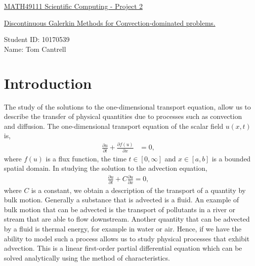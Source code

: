 \documentclass[a4paper, 12pt]{article}
\begin{document}

\begin{center}
\Large\underline{MATH49111 Scientific Computing - Project 2} \\
\end{center}
\begin{center}
\large\underline{Discontinuous Galerkin Methods for Convection-dominated problems.}\\
\end{center}

Student ID: 10170539\\

Name: Tom Cantrell\\
\newpage



\newpage
\section{Introduction}

The study of the solutions to the one-dimensional transport equation, allow us to describe the transfer of physical quantities due to processes such as convection and diffusion. The one-dimensional transport equation of the scalar field $u(x,t)$ is,
\begin{align*}
\frac{\partial u}{\partial t} + \frac{\partial f(u)}{\partial x} &= 0,
\end{align*} 
where $f(u)$ is a flux function, the time $t \in [0,\infty]$ and $x \in [a,b]$ is a bounded spatial domain. In studying the solution to the advection equation,
\begin{align*}
\frac{\partial u}{\partial t} + C\frac{\partial u}{\partial x} = 0,
\end{align*}
where $C$ is a constant, we obtain a description of the transport of a quantity by bulk motion. Generally a substance that is advected is a fluid. An example of bulk motion that can be advected is the transport of pollutants in a river or stream that are able to flow downstream. Another quantity that can be advected by a fluid is thermal energy, for example in water or air. Hence, if we have the ability to model such a process allows us to study physical processes that exhibit advection. This is a linear first-order partial differential equation which can be solved analytically using the method of characteristics.\\
\end{document}

